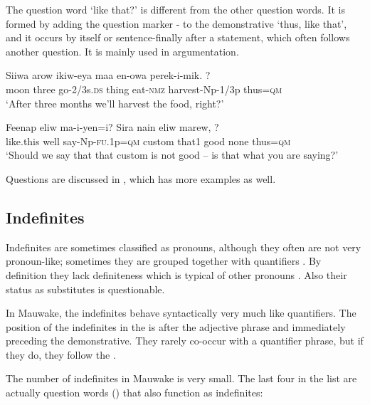 The question word  `like that?' is different from the other question words. It is formed by adding the question marker - to the demonstrative  `thus, like that', and it occurs by itself or sentence-finally after a statement, which often follows another question. It is mainly used in argumentation. 

\ea%
\label{ex:3:x1194}
\gll Siiwa arow ikiw-eya maa en-owa perek-i-mik. ? \\
moon three go-2/3s.\textsc{ds} thing eat-\textsc{nmz} harvest-Np-1/3p thus=\textsc{qm}\\
\glt`After three months we'll harvest the food, right?'
\z

\ea%
\label{ex:3:x1195}
\gll Feenap eliw ma-i-yen=i? Sira nain eliw marew, ?\\
like.this well say-Np-\textsc{fu}.1p=\textsc{qm} custom that1 good none thus=\textsc{qm}\\
\glt`Should we say that that custom is not good -- is that what you are saying?'
\z

Questions are discussed in , which has more examples as well.

\subsection{Indefinites}\label{sec:3:y:x}
{}
Indefinites are sometimes classified as pronouns, although they often are not very pronoun-like; sometimes they are grouped together with quantifiers \citep[81]{HakulinenEtAl1979}%
. By definition they lack definiteness which is typical of other pronouns \citep[376]{QuirkEtAl1985}. Also their status as  substitutes is questionable.

In Mauwake, the indefinites behave syntactically very much like quantifiers. The position of the indefinites in the  is after the adjective phrase and immediately preceding the demonstrative. They rarely co-occur with a quantifier phrase, but if they do, they follow the .

The number of indefinites in Mauwake is very small. The last four in the list are actually question words () that also function as indefinites:


